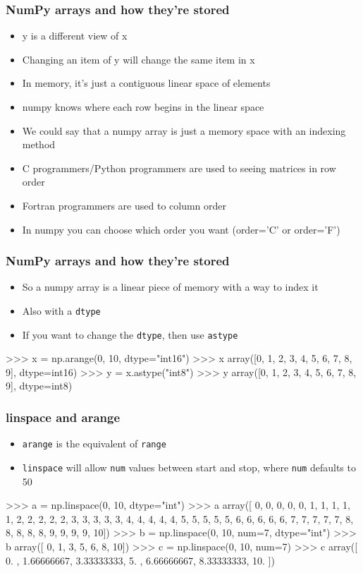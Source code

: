 \documentclass{beamer}
\begin{document}
\begin{frame}[fragile]
\frametitle{NumPy arrays and how they're stored}
\begin{itemize}
\item y is a different view of x
\item Changing an item of y will change the same item in x
\item In memory, it's just a contiguous linear space of elements
\item numpy knows where each row begins in the linear space
\item We could say that a numpy array is just a memory space with an
  indexing method
\item C programmers/Python programmers are used to seeing matrices in row order
\item Fortran programmers are used to column order
\item In numpy you can choose which order you want (order='C' or order='F')
\end{itemize}
\end{frame}

\begin{frame}[fragile]
\frametitle{NumPy arrays and how they're stored}
\begin{itemize}
\item So a numpy array is a linear piece of memory with a way to index it
\item Also with a \texttt{dtype}
\item If you want to change the \texttt{dtype}, then use \texttt{astype}
\end{itemize}
\begin{code}
>>> x = np.arange(0, 10, dtype="int16")
>>> x
array([0, 1, 2, 3, 4, 5, 6, 7, 8, 9], dtype=int16)
>>> y = x.astype("int8")
>>> y
array([0, 1, 2, 3, 4, 5, 6, 7, 8, 9], dtype=int8)
\end{code}
\end{frame}

\begin{frame}[fragile]
\frametitle{linspace and arange}
\begin{itemize}
\item \texttt{arange} is the equivalent of \texttt{range}
\item \texttt{linspace} will allow \texttt{num} values between start
  and stop, where \texttt{num} defaults to 50
\end{itemize}
\begin{code}
>>> a = np.linspace(0, 10, dtype="int")
>>> a
array([ 0,  0,  0,  0,  0,  1,  1,  1,  1,  1,  2,  2,  2,  2,  2,  3, 
        3,  3,  3,  3,  4,  4,  4,  4,  4,  5,  5,  5,  5,  5,  6,  6, 
        6, 6, 6,  7,  7,  7,  7,  7,  8,  8,  8,  8,  8,  9,  9,  
        9, 9, 10])
>>> b = np.linspace(0, 10, num=7, dtype="int")
>>> b
array([ 0,  1,  3,  5,  6,  8, 10])
>>> c = np.linspace(0, 10, num=7)
>>> c
array([  0. ,  1.66666667, 3.33333333,  5.   ,
         6.66666667,   8.33333333,  10.  ])
\end{code}
\end{frame}
\end{document}
